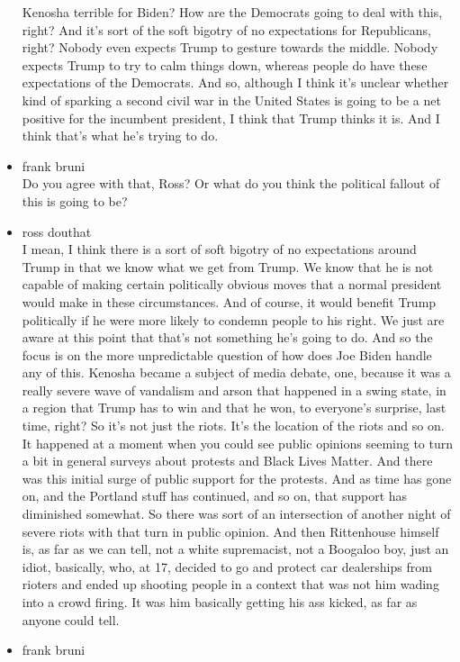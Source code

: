 \begin{itemize}
  Kenosha terrible for Biden? How are the Democrats going to deal with
  this, right? And it's sort of the soft bigotry of no expectations for
  Republicans, right? Nobody even expects Trump to gesture towards the
  middle. Nobody expects Trump to try to calm things down, whereas
  people do have these expectations of the Democrats. And so, although I
  think it's unclear whether kind of sparking a second civil war in the
  United States is going to be a net positive for the incumbent
  president, I think that Trump thinks it is. And I think that's what
  he's trying to do.
\item
  frank bruni\\
  Do you agree with that, Ross? Or what do you think the political
  fallout of this is going to be?
\item
  ross douthat\\
  I mean, I think there is a sort of soft bigotry of no expectations
  around Trump in that we know what we get from Trump. We know that he
  is not capable of making certain politically obvious moves that a
  normal president would make in these circumstances. And of course, it
  would benefit Trump politically if he were more likely to condemn
  people to his right. We just are aware at this point that that's not
  something he's going to do. And so the focus is on the more
  unpredictable question of how does Joe Biden handle any of this.
  Kenosha became a subject of media debate, one, because it was a really
  severe wave of vandalism and arson that happened in a swing state, in
  a region that Trump has to win and that he won, to everyone's
  surprise, last time, right? So it's not just the riots. It's the
  location of the riots and so on. It happened at a moment when you
  could see public opinions seeming to turn a bit in general surveys
  about protests and Black Lives Matter. And there was this initial
  surge of public support for the protests. And as time has gone on, and
  the Portland stuff has continued, and so on, that support has
  diminished somewhat. So there was sort of an intersection of another
  night of severe riots with that turn in public opinion. And then
  Rittenhouse himself is, as far as we can tell, not a white
  supremacist, not a Boogaloo boy, just an idiot, basically, who, at 17,
  decided to go and protect car dealerships from rioters and ended up
  shooting people in a context that was not him wading into a crowd
  firing. It was him basically getting his ass kicked, as far as anyone
  could tell.
\item
  frank bruni\\

\end{itemize}
